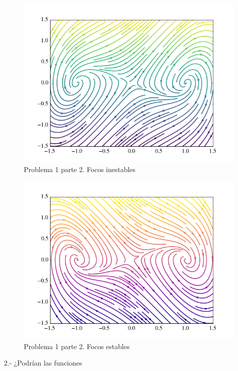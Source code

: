 \documentclass[a4paper,10pt]{article}
\begin{document}
\begin{figure}[h!]
 \centering
\includegraphics[scale=0.3]{problema1fig3}
\caption{Problema 1 parte 2. Focos inestables}
\label{fig:problema1fig3}
\end{figure}

\begin{figure}[h!]
 \centering
\includegraphics[scale=0.3]{problema1fig4}
\caption{Problema 1 parte 2. Focos estables}
\label{fig:problema1fig4}
\end{figure}




\vspace{.3cm}

2.- ¿Podrían las funciones 
\end{document}
